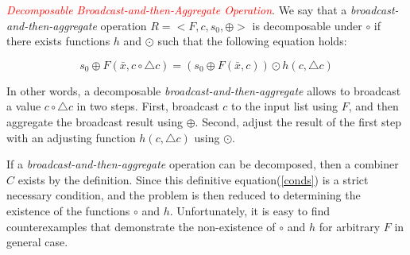 \textit{\textcolor{red}{Decomposable Broadcast-and-then-Aggregate Operation}}.
We say that a \textit{broadcast-and-then-aggregate} operation $R=<F,c,s_0,\oplus>$ is decomposable under $\circ$ if there exists functions $h$ and $\odot$ such that the following equation holds:

\begin{equation}
s_0 \oplus F(\bar{x}, c \circ \triangle c)=(s_0 \oplus F(\bar{x}, c)) \odot h(c, \triangle c)\label{conds}
\end{equation}

In other words, a decomposable \textit{broadcast-and-then-aggregate} allows to broadcast a value $c \circ \triangle c$ in two steps.
First, broadcast $c$ to the input list using $F$, and then aggregate the broadcast result using $\oplus$.
Second, adjust the result of the first step with an adjusting function $h(c, \triangle c)$ using $\odot$.




If a \textit{broadcast-and-then-aggregate} operation can be decomposed, then a combiner $C$ exists by the definition.
Since this definitive equation(\ref{conds}) is a strict necessary condition,
and the problem is then reduced to determining the existence of the functions $\circ$ and $h$.
Unfortunately, it is easy to find counterexamples that demonstrate the non-existence of $\circ$ and $h$ for arbitrary $F$ in general case.


